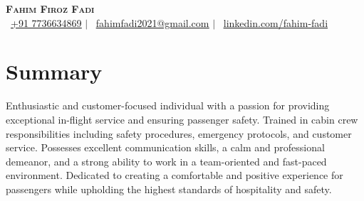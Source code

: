 \documentclass[a4paper,11pt]{article}
\begin{document}
\begin{minipage}[c]{0.15\textwidth}
\end{minipage}
\begin{minipage}[t]{0.84\textwidth}  %
	\begin{center}
		{\selectfont \textbf{\Huge \scshape {Fahim Firoz Fadi}}} \\ \vspace{1pt}
		\small{
			\raisebox{-0.1\height}\faPhone\ \href{tel:+917736634869}{\underline{+91 7736634869}} $|$
			\raisebox{-0.2\height}\faEnvelope\ \href{mailto:fahimfadi2021@gmail.com}{\underline{fahimfadi2021@gmail.com}} $|$
			\raisebox{-0.2\height}\faLinkedin\ \href{https://www.linkedin.com/in/fahim-fadi-816155310}{\underline{linkedin.com/fahim-fadi}}
		}
	\end{center}
\end{minipage}


\section{Summary}
\begin{itemize}[leftmargin=0.15in, label={}]
	\small{\item{
		Enthusiastic and customer-focused individual with a passion for providing exceptional in-flight service and ensuring passenger safety. Trained in cabin crew responsibilities including safety procedures, emergency protocols, and customer service. Possesses excellent communication skills, a calm and professional demeanor, and a strong ability to work in a team-oriented and fast-paced environment. Dedicated to creating a comfortable and positive experience for passengers while upholding the highest standards of hospitality and safety.
				}}
\end{itemize}
\end{document}
